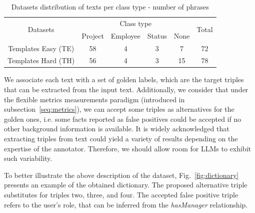 \documentclass[runningheads]{llncs}
\begin{document}
\begin{table}[!tb]
\centering
\caption{Datasets distribution of texts per class type - number of phrases}
\begin{tabular}{cccccc}
\hline
\multirow{2}{*}{Datasets} & \multicolumn{4}{c}{Class type}     & \multirow{2}{*}{Total} \\
        & Project & Employee & Status & None & \\
\hline
Templates Easy (TE)	&   58 & 	4	 & 3  &	7  &	72 \\
Templates Hard (TH) & 	56 & 	4	 & 3	& 15 &	78 \\
\hline
\end{tabular}
\label{tbl:datasets}
\end{table}

We associate each text with a set of golden labels, which are the target triples that can be extracted from the input text. Additionally, we consider that under the flexible metrics measurements paradigm (introduced in subsection~\ref{seq:metrics}), we can accept some triples as alternatives for  the golden ones,  i.e. some facts reported as false positives could be accepted if no other background information is available. It is widely acknowledged that extracting triples from text could yield a variety of  results depending on the expertise of the annotator. Therefore, we should allow room for LLMs to exhibit such variability.

To better illustrate the above description of the dataset, Fig.~\ref{fig:dictionary} presents an example of the obtained dictionary. The proposed alternative triple substitutes for triples two, three, and four. The accepted false positive triple refers to the user’s role, that can be inferred from the \textit{hasManager} relationship. 
\end{document}
